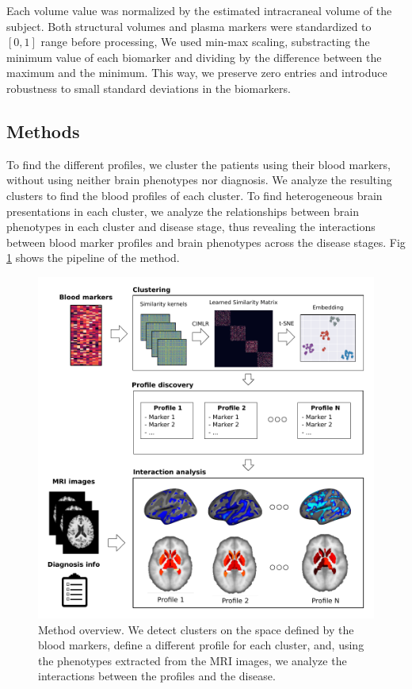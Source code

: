 Each volume value was normalized by the estimated intracraneal volume of the subject. Both structural volumes and plasma markers were standardized to $[0,1]$ range before processing, We used min-max scaling, substracting the minimum value of each biomarker and dividing by the difference between the maximum and the minimum. This way, we preserve zero entries and introduce robustness to small standard deviations in the biomarkers.\\

\subsection{Methods}
\label{methods}

To find the different profiles, we cluster the patients using their blood markers, without using neither brain phenotypes nor diagnosis. We analyze the resulting clusters to find the blood profiles of each cluster. To find heterogeneous brain presentations in each cluster, we analyze the relationships between brain phenotypes in each cluster and disease stage, thus revealing the interactions between blood marker profiles and brain phenotypes across the disease stages. Fig \ref{figmethod} shows the pipeline of the method. \\

\begin{figure}[!h]
\centering
 \includegraphics[width=1.0\textwidth]{figures/cimlr/figure_1_new.pdf}
    \caption[Method overview.]{Method overview. We detect clusters on the space defined by the blood markers, define a different profile for each cluster, and, using the phenotypes extracted from the MRI images, we analyze the interactions between the profiles and the disease.}
    \label{figmethod}
\end{figure}

